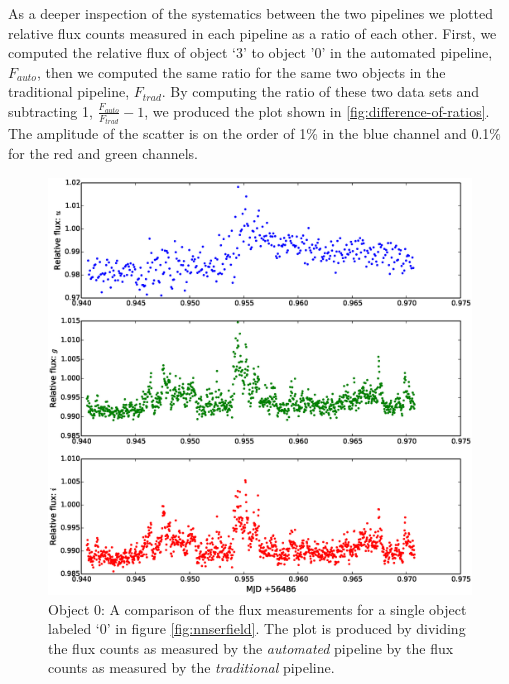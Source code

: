 As a deeper inspection of the systematics between the two pipelines we plotted relative flux counts measured in each pipeline as a ratio of each other. First, we computed the relative flux of object `3' to object '0' in the automated pipeline, $F_{auto}$, then we computed the same ratio for the same two objects in the traditional pipeline, $F_{trad}$. By computing the ratio of these two data sets and subtracting 1,  $\frac{F_{auto}}{F_{trad}} - 1$, we produced the plot shown in \ref{fig:difference-of-ratios}. The amplitude of the scatter is on the order of 1\% in the blue channel and 0.1\% for the red and green channels. 

\begin{figure}
\centering
\includegraphics[width=140mm]{images/compare_photometry.eps}
\caption{Object 0: A comparison of the flux measurements for a single object labeled `0' in figure \ref{fig:nnserfield}. The plot is produced by dividing the flux counts as measured by the \emph{automated} pipeline by the flux counts as measured by the \emph{traditional} pipeline.}
\label{fig:comparephotometry}
\end{figure}

